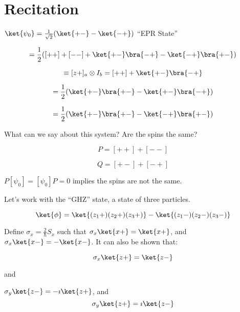 \documentclass[a4paper,twoside,master.tex]{subfiles}
\begin{document}
\section{Recitation}
\label{sec:recitation}

$\ket{\psi_0} = \frac{1}{\sqrt{2}}(\ket{+-}-\ket{-+})$ ``EPR
State''

\begin{equation}
[\psi_0] = \frac{1}{2}([++]+[--]+\ket{+-}\bra{ -+}-\ket{-+}\bra{ +-})
\end{equation}

\begin{equation}
[z_a+]\equiv[z+]_a\otimes I_b = [++] + \ket{+-}\bra{ -+}
\end{equation}

\begin{equation}
[\psi_0][z_a+]=\frac{1}{2}(\ket{+-}\bra{ +-} - \ket{+-}\bra{ -+})
\end{equation}

\begin{equation}
[z_a+][\psi_0] = \frac{1}{2}(\ket{+-}\bra{ +-} - \ket{-+}\bra{ +-})
\end{equation}

What can we say about this system? Are the spins the same?

\begin{equation}
P = [++] + [--]
\end{equation}

\begin{equation}
Q = [+-] + [-+]
\end{equation}

$P[\psi_0] = [\psi_0]P = 0$ implies the spins are not the same.

Let's work with the ``GHZ'' state, a state of three particles.

\begin{equation}
\ket{\phi} = \ket{(z_1+)(z_2+)(z_3+)} - \ket{(z_1-)(z_2-)(z_3-)}
\end{equation}

Define $\sigma_x = \frac{2}{\hbar}S_x$ such that
$\sigma_x\ket{x+} = \ket{x+}$, and
$\sigma_x\ket{x-} = -\ket{x-}$. It can also be shown that:

\begin{equation}
\sigma_x\ket{z+} = \ket{z-}
\end{equation}

and

$\sigma_y\ket{z-} = -\imath\ket{z+}$, and
\begin{equation}
\sigma_y\ket{z+} = \imath\ket{z-}
\end{equation}
\end{document}
